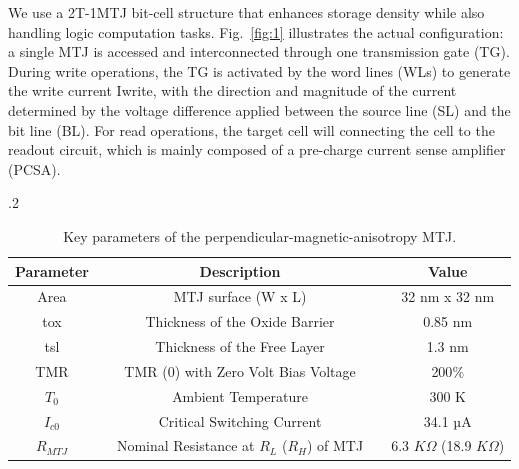 \documentclass[submit]{elex2024}%
\begin{document}
\noindent
We use a 2T-1MTJ bit-cell structure that enhances storage density while also handling logic computation tasks. Fig.~\ref{fig:1} illustrates the actual configuration: a single MTJ is accessed and interconnected through one transmission gate (TG). During write operations, the TG is activated by the word lines (WLs) to generate the write current Iwrite, with the direction and magnitude of the current determined by the voltage difference applied between the source line (SL) and the bit line (BL). For read operations, the target cell will connecting the cell to the readout circuit, which is mainly composed of a pre-charge current sense amplifier (PCSA).
\begin{table}[ht]
    \small
    \caption{Key parameters of the perpendicular-magnetic-anisotropy MTJ.} 
    \label{tab:1}
    \centering
    \tabcolsep.2\tabcolsep
    \begin{tabular}{ccccc}
    \hline
    \textbf{Parameter}      & \quad & \textbf{Description}                           & \quad & \textbf{Value}  \\
    \hline
    Area      			    & \quad & MTJ surface (W x L)                     & \quad & 32 nm x 32 nm        \\
    \hline
    tox    				    & \quad & Thickness of the Oxide Barrier                 & \quad & 0.85 nm        \\
    \hline
    tsl                     & \quad & Thickness of the Free Layer                    & \quad & 1.3 nm       \\
    \hline
    TMR                     & \quad & TMR (0) with Zero Volt Bias Voltage            & \quad & 200$\%$      \\
    \hline
    $T_0$                   & \quad & Ambient Temperature                            & \quad & 300 K        \\
    \hline
    $I_{c0}$     			& \quad & Critical Switching Current                     & \quad & 34.1 µA        \\
    \hline
    $R_{MTJ}$      			& \quad & Nominal Resistance at $R_L$ ($R_H$) of MTJ     & \quad & 6.3 $K\Omega$ (18.9 $K\Omega$)        \\
    \hline
    \end{tabular}
\end{table}
\end{document}
